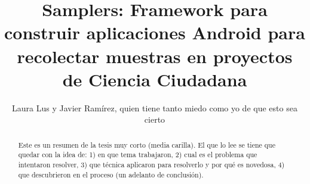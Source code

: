\documentclass[11pt]{report}
\title{Samplers: Framework para construir aplicaciones Android para recolectar muestras  en proyectos de Ciencia Ciudadana}
\author{Laura Lus y Javier Ramírez, quien tiene tanto miedo como yo de que esto sea cierto}
\begin{document}
\maketitle

\begin{abstract}
Este es un resumen de la tesis muy corto (media carilla). El que lo lee se tiene que quedar con la idea de: 1) en que tema trabajaron, 2) cual es el problema que intentaron resolver, 3) que técnica aplicaron para resolverlo y por qué es novedosa, 4) que descubrieron en el proceso (un adelanto de conclusión). 
\end{abstract}

\tableofcontents















\end{document}
